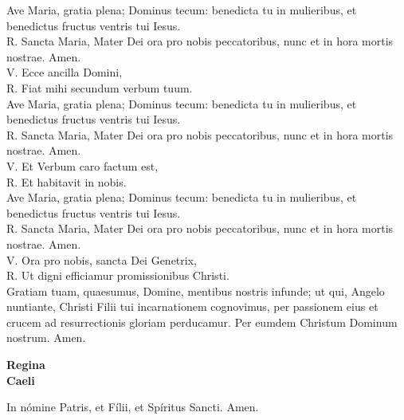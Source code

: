 \documentclass[letterpaper, landscape, 10pt, twocolumn]{article}
\begin{document}
  \noindent
  {\color{red} A}ve Maria, gratia plena; Dominus tecum: benedicta tu in mulieribus, et benedictus fructus ventris tui Iesus.\\
  {\color{red} R. S}ancta Maria, Mater Dei ora pro nobis peccatoribus, nunc et in hora mortis nostrae. {\color{red} A}men.\\

  \noindent
  {\color{red} V. E}cce ancilla Domini,\\
  {\color{red} R. F}iat mihi secundum verbum tuum.\\

  \noindent
  {\color{red} A}ve Maria, gratia plena; Dominus tecum: benedicta tu in mulieribus, et benedictus fructus ventris tui Iesus.\\
  {\color{red} R. S}ancta Maria, Mater Dei ora pro nobis peccatoribus, nunc et in hora mortis nostrae. {\color{red} A}men.\\

  \noindent
  {\color{red} V. E}t Verbum caro factum est,\\
  {\color{red} R. E}t habitavit in nobis.\\

  \noindent
  {\color{red} A}ve Maria, gratia plena; Dominus tecum: benedicta tu in mulieribus, et benedictus fructus ventris tui Iesus.\\
  {\color{red} R. S}ancta Maria, Mater Dei ora pro nobis peccatoribus, nunc et in hora mortis nostrae. {\color{red} A}men.\\

  \noindent
  {\color{red} V. O}ra pro nobis, sancta Dei Genetrix,\\
  {\color{red} R. U}t digni efficiamur promissionibus Christi.\\

  \noindent
  {\color{red} G}ratiam tuam, quaesumus, Domine, mentibus nostris infunde; ut qui, Angelo nuntiante, Christi Filii tui incarnationem cognovimus, per passionem eius et crucem ad resurrectionis gloriam perducamur. Per eumdem Christum Dominum nostrum. {\color{red} A}men.\\
  \vfill

  \begin{center}
    {\fontsize{50pt}{60pt}\selectfont \textbf{Regina\\ Caeli}}\\
  \end{center}
  \vspace{1cm}

  \noindent
  \Large {\color{red} I}n nómine Patris, et Fílii, et Spíritus Sancti. {\color{red} A}men.\\
\end{document}

